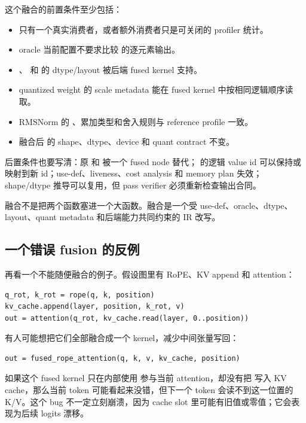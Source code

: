 这个融合的前置条件至少包括：

\begin{itemize}
  \item {} 只有一个真实消费者，或者额外消费者只是可关闭的 profiler 统计。
  \item oracle 当前配置不要求比较  的逐元素输出。
  \item {}、 和  的 dtype/layout 被后端 fused kernel 支持。
  \item quantized weight 的 scale metadata 能在 fused kernel 中按相同逻辑顺序读取。
  \item RMSNorm 的 、累加类型和舍入规则与 reference profile 一致。
  \item 融合后  的 shape、dtype、device 和 quant contract 不变。
\end{itemize}

后置条件也要写清：原  和  被一个 fused node 替代； 的逻辑 value id 可以保持或映射到新 id；use-def、liveness、cost analysis 和 memory plan 失效；shape/dtype 推导可以复用，但 pass verifier 必须重新检查输出合同。

\begin{keyidea}
融合不是把两个函数塞进一个大函数。融合是一个受 use-def、oracle、dtype、layout、quant metadata 和后端能力共同约束的 IR 改写。
\end{keyidea}

\subsection{一个错误 fusion 的反例}

再看一个不能随便融合的例子。假设图里有 RoPE、KV append 和 attention：

\begin{lstlisting}[numbers=none,caption={RoPE、KV append 与 attention 的状态边}]
q_rot, k_rot = rope(q, k, position)
kv_cache.append(layer, position, k_rot, v)
out = attention(q_rot, kv_cache.read(layer, 0..position))
\end{lstlisting}

有人可能想把它们全部融合成一个  kernel，减少中间张量写回：

\begin{lstlisting}[numbers=none,caption={错误融合：丢掉了状态写入}]
out = fused_rope_attention(q, k, v, kv_cache, position)
\end{lstlisting}

如果这个 fused kernel 只在内部使用  参与当前 attention，却没有把  写入 KV cache，那么当前 token 可能看起来没错，但下一个 token 会读不到这一位置的 K/V。这个 bug 不一定立刻崩溃，因为 cache slot 里可能有旧值或零值；它会表现为后续 logits 漂移。

